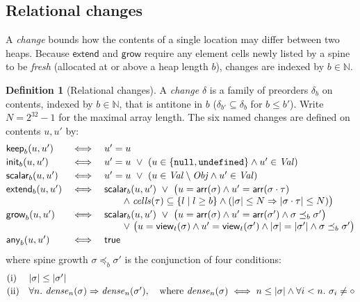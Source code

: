 \documentclass[10pt,a4paper]{article}
\theoremstyle{definition}
\newtheorem{definition}[theorem]{Definition}
\theoremstyle{remark}
\newcommand{\kw}[1]{\mathsf{#1}}
\newcommand{\keep}{\kw{keep}}
\newcommand{\init}{\kw{init}}
\newcommand{\extend}{\kw{extend}}
\newcommand{\grow}{\kw{grow}}
\newcommand{\any}{\kw{any}}
\newcommand{\len}[1]{|#1|}
\newcommand{\code}[1]{\texttt{#1}}
\begin{document}
\subsection{Relational changes}

A \emph{change} bounds how the contents of a single location may differ
between two heaps. Because $\extend$ and $\grow$ require any element
cells newly listed by a spine to be \emph{fresh} (allocated at or above a
heap length $b$), changes are indexed by $b\in\mathbb{N}$.

\begin{definition}[Relational changes]\label{def:changes}
A \emph{change} $\delta$ is a family of preorders $\delta_b$ on contents,
indexed by $b\in\mathbb{N}$, that is antitone in $b$
($\delta_{b'}\subseteq\delta_b$ for $b\le b'$). Write $N=2^{32}-1$ for
the maximal array length. The six named changes are defined on contents
$u,u'$ by:
{\small\begin{displaymath}
\begin{array}{@{}lcl@{}}
\keep_b(u,u') &\iff& u'=u\\[2pt]
\init_b(u,u') &\iff& u'=u\ \vee\ (u\in\{\code{null},\code{undefined}\}\wedge u'\in\mathit{Val})\\[2pt]
\kw{scalar}_b(u,u') &\iff& u'=u\ \vee\ (u\in\mathit{Val}\setminus\mathit{Obj}\wedge u'\in\mathit{Val})\\[2pt]
\extend_b(u,u') &\iff& \kw{scalar}_b(u,u')\ \vee\ \bigl(u=\mathsf{arr}(\sigma)\wedge u'=\mathsf{arr}(\sigma\cdot\tau)\\
 & & \qquad\wedge\;\mathit{cells}(\tau)\subseteq\{l\mid l\ge b\}\wedge(\len\sigma\le N\Rightarrow\len{\sigma\cdot\tau}\le N)\bigr)\\[2pt]
\grow_b(u,u') &\iff& \kw{scalar}_b(u,u')\ \vee\ \bigl(u=\mathsf{arr}(\sigma)\wedge u'=\mathsf{arr}(\sigma')\wedge\sigma\preceq_b\sigma'\bigr)\\
 & & \qquad\vee\ \bigl(u=\mathsf{view}_t(\sigma)\wedge u'=\mathsf{view}_t(\sigma')\wedge\len\sigma=\len{\sigma'}\wedge\sigma\preceq_b\sigma'\bigr)\\[2pt]
\any_b(u,u') &\iff& \kw{true}
\end{array}
\end{displaymath}}
where spine growth $\sigma\preceq_b\sigma'$ is the conjunction of four conditions:
{\small\begin{displaymath}
\begin{array}{@{}ll@{}}
\text{(i)} & \len\sigma\le\len{\sigma'}\\[2pt]
\text{(ii)} & \forall n.\ \mathit{dense}_n(\sigma)\Rightarrow\mathit{dense}_n(\sigma'),\quad\text{where }\mathit{dense}_n(\sigma)\iff n\le\len\sigma\wedge\forall i<n.\ \sigma_i\ne\circ\\[2pt]

\end{array}
\end{displaymath}}
\end{definition}
\end{document}
